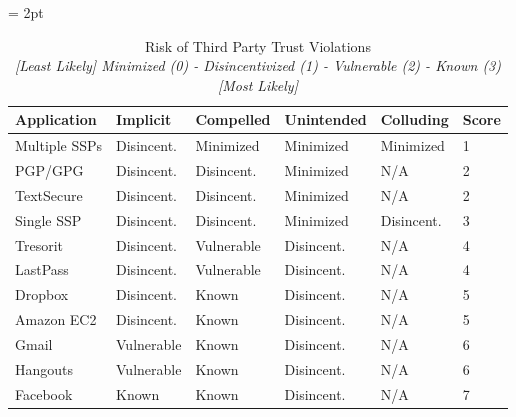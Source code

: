 \begin{table}[!hb]
  \footnotesize
  \centering
  \tabulinesep = 2pt
  \begin{tabu} to \textwidth
    { | X[1,c,m]
      | X[1,c,m]
      | X[1,c,m]
      | X[1,c,m]
      | X[1,c,m]
      | X[0.5,c,m]
      | }
    \hline
    \textbf{Application}
    & \textbf{Implicit}
    & \textbf{Compelled}
    & \textbf{Unintended}
    & \textbf{Colluding}
    & \textbf{Score}
    \\ \hline
    \rowfont{\color{ForestGreen}}
    Multiple SSPs
    & Disincent.
    & Minimized
    & Minimized
    & Minimized
    & 1
    \\ \hline
    \rowfont{\color{orange}}
    PGP/GPG
    & Disincent.
    & Disincent.
    & Minimized
    & N/A
    & 2
    \\ \hline
    \rowfont{\color{orange}}
    TextSecure
    & Disincent.
    & Disincent.
    & Minimized
    & N/A
    & 2
    \\ \hline
    \rowfont{\color{ForestGreen}}
    Single SSP
    & Disincent.
    & Disincent.
    & Minimized
    & Disincent.
    & 3
    \\ \hline
    \rowfont{\color{orange}}
    Tresorit
    & Disincent.
    & Vulnerable
    & Disincent.
    & N/A
    & 4
    \\ \hline
    \rowfont{\color{orange}}
    LastPass
    & Disincent.
    & Vulnerable
    & Disincent.
    & N/A
    & 4
    \\ \hline
    \rowfont{\color{blue}}
    Dropbox
    & Disincent.
    & Known
    & Disincent.
    & N/A
    & 5
    \\ \hline
    \rowfont{\color{blue}}
    Amazon EC2
    & Disincent.
    & Known
    & Disincent.
    & N/A
    & 5
    \\ \hline
    \rowfont{\color{blue}}
    Gmail
    & Vulnerable
    & Known
    & Disincent.
    & N/A
    & 6
    \\ \hline
    \rowfont{\color{blue}}
    Hangouts
    & Vulnerable
    & Known
    & Disincent.
    & N/A
    & 6
    \\ \hline
    \rowfont{\color{blue}}
    Facebook
    & Known
    & Known
    & Disincent.
    & N/A
    & 7
    \\ \hline
  \end{tabu}
  \caption[Risk of Third Party Trust Violations]{
    Risk of Third Party Trust Violations\\
    \textit{[Least Likely] Minimized (0) - Disincentivized (1) -
      Vulnerable (2) - Known (3) [Most Likely]}
  }
  \label{tab:trust:app:threats}
\end{table}


